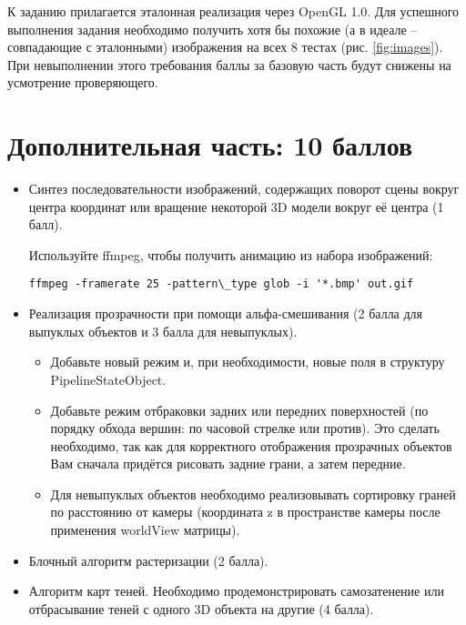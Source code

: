 \documentclass[12pt,subf,href,colorlinks=true]{article}
\begin{document}
К заданию прилагается эталонная реализация через OpenGL 1.0. Для успешного выполнения задания необходимо получить хотя бы похожие (а в идеале -- совпадающие с эталонными) изображения на всех 8 тестах (рис. \ref{fig:images}). При невыполнении этого требования баллы за базовую часть будут снижены на усмотрение проверяющего.

\section{Дополнительная часть: 10 баллов}

\begin{itemize}

	\item Синтез последовательности изображений, содержащих поворот сцены вокруг центра координат или вращение некоторой 3D модели вокруг её центра (1 балл).

  Используйте ffmpeg, чтобы получить анимацию из набора изображений:
  \begin{verbatim}ffmpeg -framerate 25 -pattern\_type glob -i '*.bmp' out.gif \end{verbatim}


  \item Реализация прозрачности при помощи альфа-смешивания (2 балла для выпуклых объектов и 3 балла для невыпуклых).

  \begin{itemize}
    \item Добавьте новый режим и, при необходимости, новые поля в структуру \newline PipelineStateObject.

    \item Добавьте режим отбраковки задних или передних поверхностей (по порядку обхода вершин: по часовой стрелке или против). Это сделать необходимо, так как для корректного отображения прозрачных объектов Вам сначала придётся рисовать задние грани, а затем передние.

    \item Для невыпуклых объектов необходимо реализовывать сортировку граней по расстоянию от камеры (координата z в пространстве камеры после применения worldView матрицы).
  \end{itemize}


  \item Блочный алгоритм растеризации (2 балла).

	\item Алгоритм карт теней. Необходимо продемонстрировать самозатенение или отбрасывание теней с одного 3D объекта на другие (4 балла).
\end{itemize}
\end{document}
